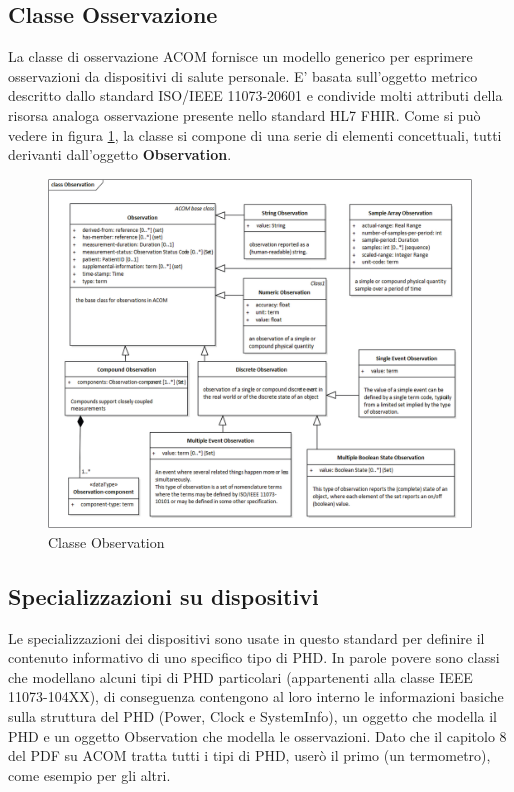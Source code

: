 \documentclass{article}
\begin{document}
\subsection{Classe Osservazione}
La classe di osservazione ACOM fornisce un modello generico per esprimere osservazioni da dispositivi di salute personale.
E' basata sull'oggetto metrico descritto dallo standard ISO/IEEE 11073-20601 e condivide molti attributi della risorsa analoga osservazione presente nello standard HL7 FHIR.
Come si può vedere in figura \ref{fig:observationClass}, la classe si compone di una serie di elementi concettuali, tutti derivanti dall'oggetto \textbf{Observation}.

\begin{figure}[H]
    \centering
    \includegraphics[width=1\textwidth]{figures/observation class.png}
    \caption{Classe Observation}
    \label{fig:observationClass}
\end{figure}

\subsection{Specializzazioni su dispositivi}
Le specializzazioni dei dispositivi sono usate in questo standard per definire il contenuto informativo di uno specifico tipo di PHD.
In parole povere sono classi che modellano alcuni tipi di PHD particolari (appartenenti alla classe IEEE 11073-104XX), di conseguenza contengono al loro interno le informazioni basiche sulla struttura del PHD (Power, Clock e SystemInfo),
un oggetto che modella il PHD e un oggetto Observation che modella le osservazioni.
Dato che il capitolo 8 del PDF su ACOM tratta tutti i tipi di PHD, userò il primo (un termometro), come esempio per gli altri.
\end{document}
